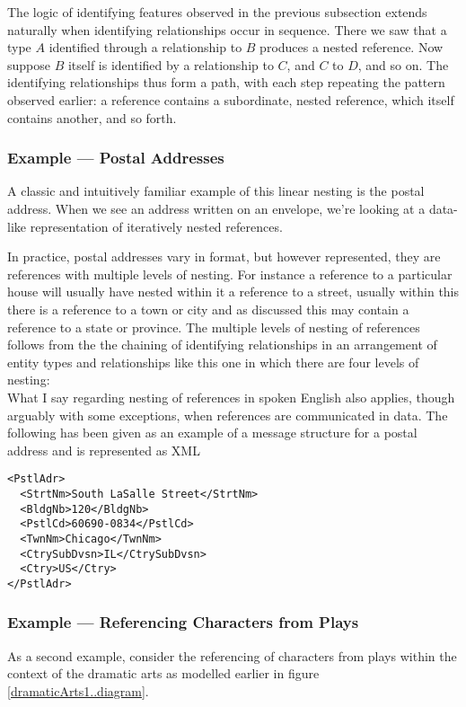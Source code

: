 \begin{worktt}
The logic of identifying features observed in the previous subsection extends naturally when identifying relationships occur in sequence.
There we saw that a type $A$ identified through a relationship to $B$ produces a nested reference.
Now suppose $B$ itself is identified by a relationship to $C$, and $C$ to $D$, and so on.
The identifying relationships thus form a path, with each step repeating the pattern observed earlier: a reference contains a subordinate, nested reference, which itself contains another, and so forth.


\end{worktt}

\subsubsection{Example --- Postal Addresses}

A classic and intuitively familiar example of this linear nesting is the postal address. 
When we see an address written on an envelope, we’re looking at a data-like representation of iteratively nested references.

In practice, postal addresses vary in format, but however represented, they are references with multiple levels of nesting.
For instance a reference to a particular house will usually have nested within it a reference to a street, usually within this there is a reference to a town or city and
as discussed this may contain a reference to a state or province.  
The multiple levels of nesting of references follows from the
the chaining of identifying relationships in an arrangement
of entity types and relationships like this one in which there are four levels of nesting:
\begin{equation*}

\end{equation*}
\mynote
What I say regarding nesting of references in spoken English also applies, though arguably with some exceptions, when references are communicated in data.
The following has been given as an example of a message structure for a postal address and is represented as XML
\begin{verbatim}
<PstlAdr>
  <StrtNm>South LaSalle Street</StrtNm>
  <BldgNb>120</BldgNb>
  <PstlCd>60690-0834</PstlCd>
  <TwnNm>Chicago</TwnNm>
  <CtrySubDvsn>IL</CtrySubDvsn>
  <Ctry>US</Ctry>
</PstlAdr>
\end{verbatim}

\subsubsection{Example --- Referencing Characters from Plays}
\label{exampleReferencingCharacters}
\mynote
 As a second example, consider the referencing of characters from  plays
 within the context of  the  dramatic arts
  as modelled earlier in figure \ref{dramaticArts1..diagram}.


